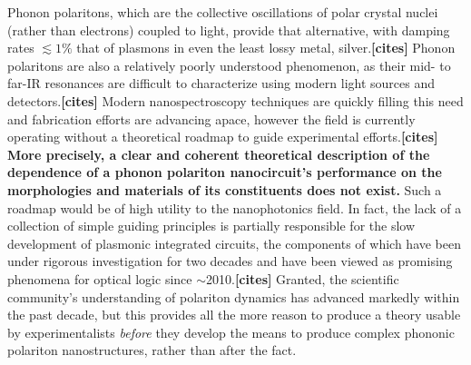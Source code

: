 \documentclass[11pt,a4paper]{article}
\begin{document}
Phonon polaritons, which are the collective oscillations of polar crystal nuclei (rather than electrons) coupled to light, provide that alternative, with damping rates $\lesssim1\%$ that of plasmons in even the least lossy metal, silver.\textbf{[cites]} Phonon polaritons are also a relatively poorly understood phenomenon, as their mid- to far-IR resonances are difficult to characterize using modern light sources and detectors.\textbf{[cites]} Modern nanospectroscopy techniques are quickly filling this need and fabrication efforts are advancing apace, however the field is currently operating without a theoretical roadmap to guide experimental efforts.\textbf{[cites]} \textbf{More precisely, a clear and coherent theoretical description of the dependence of a phonon polariton nanocircuit's performance on the morphologies and materials of its constituents does not exist.} Such a roadmap would be of high utility to the nanophotonics field. In fact, the lack of a collection of simple guiding principles is partially responsible for the slow development of plasmonic integrated circuits, the components of which have been under rigorous investigation for two decades and have been viewed as promising phenomena for optical logic since $\sim$2010.\textbf{[cites]} Granted, the scientific community's understanding of polariton dynamics has advanced markedly within the past decade, but this provides all the more reason to produce a theory usable by experimentalists \textit{before} they develop the means to produce complex phononic polariton nanostructures, rather than after the fact. 
\end{document}
